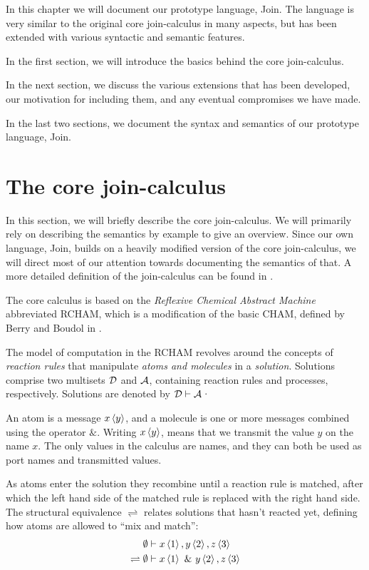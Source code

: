 
In this chapter we will document our prototype language, Join.  The
language is very similar to the original core join-calculus in many
aspects, but has been extended with various syntactic and semantic
features.

In the first section, we will introduce the basics behind the core
join-calculus.

In the next section, we discuss the various extensions that has been
developed, our motivation for including them, and any eventual compromises we
have made.

In the last two sections, we document the syntax and semantics of our prototype
language, Join.

\section{The core join-calculus}

In this section, we will briefly describe the core join-calculus. We will
primarily rely on describing the semantics by example to give an overview.
Since our own language, Join, builds on a heavily modified version of the core
join-calculus, we will direct most of our attention towards documenting the
semantics of that. A more detailed definition of the join-calculus can be found
in \cite{fournet1996reflexive}.

The core calculus is based on the \emph{Reflexive Chemical Abstract Machine}
abbreviated RCHAM, which is a modification of the basic CHAM, defined by Berry
and Boudol in \cite{berry1989chemical}.

The model of computation in the RCHAM revolves around the concepts of
\emph{reaction rules} that manipulate \emph{atoms and molecules} in a
\emph{solution}. Solutions comprise two multisets $\mathcal{D}$ and $\mathcal{A}$, containing
reaction rules and processes, respectively. Solutions are denoted by $\mathcal{D} \vdash
\mathcal{A}$·

An atom is a message $\atm x<y>$, and a molecule is one or more
messages combined using the operator $\&$. Writing $\atm x<y>$, means that we
transmit the value $y$ on the name $x$. The only values in the calculus are
names, and they can both be used as port names and transmitted values.

As atoms enter the solution they recombine until a reaction rule is matched,
after which the left hand side of the matched rule is replaced with the right
hand side. The structural equivalence $\rightleftharpoons$ relates solutions
that hasn't reacted yet, defining how atoms are allowed to ``mix and match'':
\begin{align*}
                  & \emptyset \vdash \atm x<1>, \atm y<2>, \atm z<3> \\
\rightleftharpoons{}& \emptyset \vdash \atm x<1> ~\& ~\atm y<2>, \atm z<3>
\end{align*}

